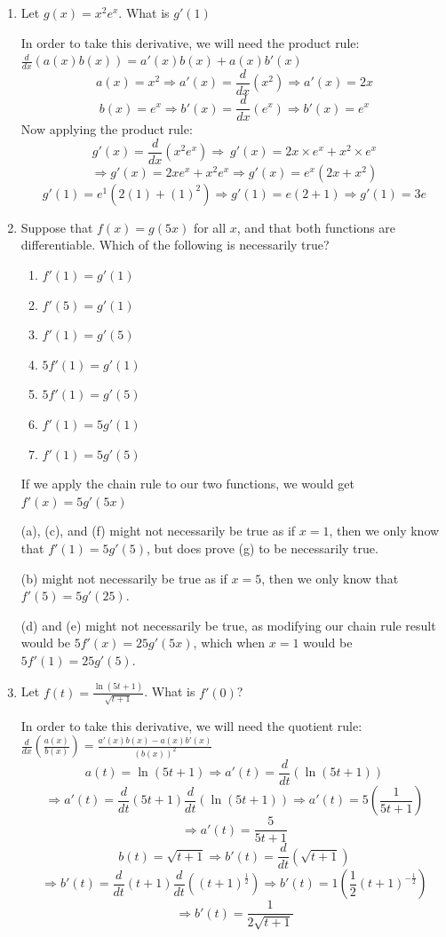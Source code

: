 \documentclass{article}
\begin{document}
\begin{enumerate}
\pagebreak
\item Let $g(x) = x^{2}e^{x}$. What is $g'(1)$

In order to take this derivative, we will need the product rule:
\\$\frac{d}{dx} (a (x) b (x)) = a' (x) b (x) + a (x) b' (x)$
\[a (x) = x^{2} \Longrightarrow a' (x) = \frac{d}{dx}\left(x^{2}\right) \Longrightarrow a' (x) = 2x\]
\[b (x) = e^{x} \Longrightarrow b' (x) = \frac{d}{dx}\left(e^{x}\right) \Longrightarrow b' (x) = e^{x}\]
Now applying the product rule:
\[g' (x) = \frac{d}{dx}\left(x^{2}e^{x}\right) \Longrightarrow\ g' (x) = 2x\times e^{x} + x^{2}\times e^{x}\]
\[\Longrightarrow g' (x) = 2xe^{x} + x^{2}e^{x} \Longrightarrow g' (x) = e^{x}\left(2x + x^{2}\right)\]
\[g' (1) = e^{1}\left(2(1) + {(1)}^{2}\right) \Longrightarrow g' (1) = e (2 + 1) \Longrightarrow g' (1) = 3e\]

\item Suppose that $f(x) = g(5x)$ for all $x$, and that both functions are differentiable.
Which of the following is necessarily true?
    \begin{enumerate}
        \item $f'(1) = g'(1)$
        \item $f'(5) = g'(1)$
        \item $f'(1) = g'(5)$
        \item $5f'(1) = g'(1)$
        \item $5f'(1) = g'(5)$
        \item $f'(1) = 5g'(1)$
        \item $f'(1) = 5g'(5)$
    \end{enumerate}

If we apply the chain rule to our two functions, we would get $f'(x) = 5g'(5x)$

(a), (c), and (f) might not necessarily be true as if $x = 1$, then we only know that 
$f'(1) = 5g'(5)$, but does prove (g) to be necessarily true.

(b) might not necessarily be true as if $x = 5$, then we only know that $f'(5) = 5g'(25)$.


(d) and (e) might not necessarily be true, as modifying our chain rule result would be 
$5f'(x) = 25g'(5x)$, which when $x = 1$ would be $5f'(1) = 25g'(5)$.

\pagebreak
\item Let $f(t) = \frac{\ln(5t + 1)}{\sqrt{t + 1}}$. What is $f'(0)$?

In order to take this derivative, we will need the quotient rule:
\\$\frac{d}{dx}\left(\frac{a (x)}{b (x)}\right) = \frac{a' (x) b (x) -a (x) b' (x)}{{(b (x))}^{2}}$
\[a(t) = \ln(5t + 1) \Longrightarrow a'(t) = \frac{d}{dt}(\ln(5t + 1))\]
\[\Longrightarrow a'(t) = \frac{d}{dt}(5t + 1)\frac{d}{dt}(\ln(5t + 1))
    \Longrightarrow a'(t) = 5\left(\frac{1}{5t + 1}\right)\]
\[\Longrightarrow a'(t) = \frac{5}{5t + 1}\]
\[b(t) = \sqrt{t + 1} \Longrightarrow b'(t) = \frac{d}{dt}(\sqrt{t + 1})\]
\[\Longrightarrow b'(t) = \frac{d}{dt}(t + 1)\frac{d}{dt}\left({(t + 1)}^{\frac{1}{2}}\right)
    \Longrightarrow b'(t) = 1\left(\frac{1}{2}{(t + 1)}^{-\frac{1}{2}}\right)\]
\[\Longrightarrow b'(t) = \frac{1}{2\sqrt{t + 1}}\]


\end{enumerate}
\end{document}
